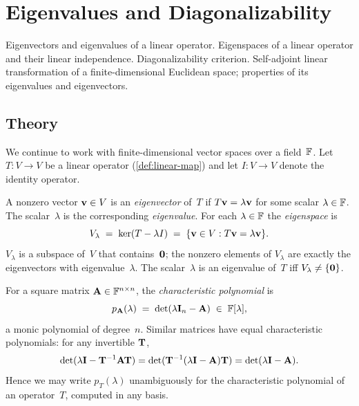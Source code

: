 
\section{Eigenvalues and Diagonalizability}
\label{sec:1.1.06-eigenvalues}

\begin{ticket}
Eigenvectors and eigenvalues of a linear operator. Eigenspaces of a linear operator and their linear independence. Diagonalizability criterion. Self-adjoint linear transformation of a finite-dimensional Euclidean space; properties of its eigenvalues and eigenvectors.
\end{ticket}

\subsection*{Theory}

We continue to work with finite-dimensional vector spaces over a
field~$\mathbb{F}$. Let $T \colon V \to V$ be a linear operator
(\cref{def:linear-map}) and let $I \colon V \to V$ denote the identity
operator.

\begin{definition}
\label{def:eigenvector-value-space}
A nonzero vector $\mathbf{v} \in V$ is an \emph{eigenvector} of~$T$ if
$T\mathbf{v} = \lambda \mathbf{v}$ for some scalar $\lambda \in \mathbb{F}$. The
scalar~$\lambda$ is the corresponding \emph{eigenvalue}. For each
$\lambda \in \mathbb{F}$ the \emph{eigenspace} is
\[
  V_\lambda \;=\; \ker(T - \lambda I) \;=\; \{\mathbf{v} \in V : T\mathbf{v} = \lambda\mathbf{v}\}.
\]
$V_\lambda$ is a subspace of~$V$ that contains~$\mathbf{0}$; the nonzero
elements of $V_\lambda$ are exactly the eigenvectors with
eigenvalue~$\lambda$. The scalar~$\lambda$ is an eigenvalue of~$T$ iff
$V_\lambda \neq \{\mathbf{0}\}$.
\end{definition}

\begin{definition}
\label{def:char-poly}
For a square matrix $\mathbf{A} \in \mathbb{F}^{n \times n}$, the
\emph{characteristic polynomial} is
\[
  p_{\mathbf{A}}(\lambda) \;=\; \det(\lambda \mathbf{I}_n - \mathbf{A}) \;\in\; \mathbb{F}[\lambda],
\]
a monic polynomial of degree~$n$. Similar matrices have equal
characteristic polynomials: for any invertible $\mathbf{T}$,
\[
  \det(\lambda \mathbf{I} - \mathbf{T}^{-1}\mathbf{A}\mathbf{T})
  = \det(\mathbf{T}^{-1}(\lambda \mathbf{I} - \mathbf{A})\mathbf{T})
  = \det(\lambda \mathbf{I} - \mathbf{A}).
\]
Hence we may write $p_T(\lambda)$ unambiguously for the characteristic
polynomial of an operator~$T$, computed in any basis.
\end{definition}

